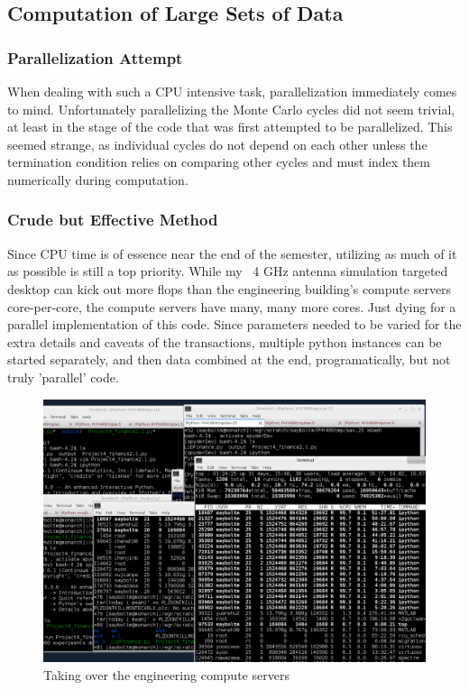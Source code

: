\documentclass[12pt]{article} %
\begin{document}
\subsection{Computation of Large Sets of Data}
\subsubsection{Parallelization Attempt}
When dealing with such a CPU intensive task, parallelization immediately comes
to mind. Unfortunately parallelizing the Monte Carlo cycles did not seem
trivial, at least in the stage of the code that was first attempted to be
parallelized. This seemed strange, as individual cycles do not depend on each
other unless the termination condition relies on comparing other cycles and
must index them numerically during computation.

\subsubsection{Crude but Effective Method}
Since CPU time is of essence near the end of the semester, utilizing as much of
it as possible is still a top priority. While my ~4 GHz antenna simulation
targeted desktop can kick out more flops than the engineering building's
compute servers core-per-core, the compute servers have many, many more cores.
Just dying for a parallel implementation of this code. Since parameters needed
to be varied for the extra details and caveats of the transactions, multiple
python instances can be started separately, and then data combined at the end,
programatically, but not truly 'parallel' code.

\begin{figure}
	\includegraphics[scale=0.75]{LOL.PNG}
	\centering
	\caption{Taking over the engineering compute servers}
	\label{fig:computeuse}
\end{figure}
\end{document}
